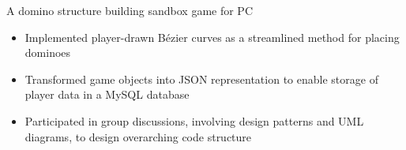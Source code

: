\documentclass{article}
\newcommand{\sectiontitle} [1] {
    {\addfontfeature{Color=darkslate} \textbf{#1}}
}
\newcommand{\tag} [1] {
    {\ttfamily \scriptsize \addfontfeature{Color=slate} {#1}}
}
\begin{document}
\begin{minipage}[t]{0.65\textwidth}
    A domino structure building sandbox game for PC

    \vspace*{1.3mm}

    \begin{itemize}[leftmargin=*, label=$\textcolor{slate}{\cdot}$, itemsep=0.5mm]
        \item Implemented player-drawn B\'ezier curves as a streamlined method for placing dominoes
        \item Transformed game objects into JSON representation to enable storage of player data in a MySQL database
        \item Participated in group discussions, involving design patterns and UML diagrams, to design overarching code structure
    \end{itemize}


    



\end{minipage}
\hfill
\end{document}
